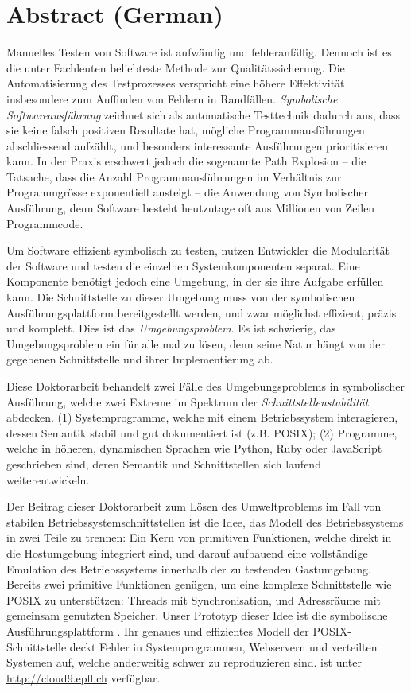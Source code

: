\chapter*{Abstract (German)}

Manuelles Testen von Software ist aufwändig und fehleranfällig. Dennoch ist es die unter Fachleuten beliebteste Methode zur Qualitätssicherung. Die Automatisierung des Testprozesses verspricht eine höhere Effektivität insbesondere zum Auffinden von Fehlern in Randfällen. \emph{Symbolische Softwareausführung} zeichnet sich als automatische Testtechnik dadurch aus, dass sie keine falsch positiven Resultate hat, mögliche Programmausführungen abschliessend aufzählt, und besonders interessante Ausführungen prioritisieren kann. In der Praxis erschwert jedoch die sogenannte Path Explosion – die Tatsache, dass die Anzahl Programmausführungen im Verhältnis zur Programmgrösse exponentiell ansteigt – die Anwendung von Symbolischer Ausführung, denn Software besteht heutzutage oft aus Millionen von Zeilen Programmcode.

Um Software effizient symbolisch zu testen, nutzen Entwickler die Modularität der Software  und testen die einzelnen Systemkomponenten separat. Eine Komponente benötigt jedoch eine Umgebung, in der sie ihre Aufgabe erfüllen kann. Die Schnittstelle zu dieser Umgebung muss von der symbolischen Ausführungsplattform bereitgestellt werden, und zwar möglichst effizient, präzis und komplett. Dies ist das \emph{Umgebungsproblem}. Es ist schwierig, das Umgebungsproblem ein für alle mal zu lösen, denn seine Natur hängt von der gegebenen Schnittstelle und ihrer Implementierung ab.

Diese Doktorarbeit behandelt zwei Fälle des Umgebungsproblems in symbolischer Aus\-füh\-rung, welche zwei Extreme im Spektrum der \emph{Schnittstellenstabilität} abdecken. (1) Systemprogramme, welche mit einem Betriebssystem interagieren, dessen Semantik stabil und gut dokumentiert ist (z.B. POSIX); (2) Programme, welche in höheren, dynamischen Sprachen wie Python, Ruby oder JavaScript geschrieben sind, deren Semantik und Schnittstellen sich laufend weiterentwickeln.

Der Beitrag dieser Doktorarbeit zum Lösen des Umweltproblems im Fall von stabilen Betriebssystemschnittstellen ist die Idee, das Modell des Betriebssystems in zwei Teile zu trennen: Ein Kern von primitiven Funktionen, welche direkt in die Hostumgebung integriert sind, und darauf aufbauend eine vollständige Emulation des Betriebssystems innerhalb der zu testenden Gastumgebung. Bereits zwei primitive Funktionen genügen, um eine komplexe Schnittstelle wie POSIX zu unterstützen: Threads mit Synchronisation, und Adressräume mit gemeinsam genutzten Speicher. Unser Prototyp dieser Idee ist die symbolische Ausführungsplattform \emph{\cnine}. Ihr genaues und effizientes Modell der POSIX-Schnittstelle deckt Fehler in Systemprogrammen, Webservern und verteilten Systemen auf, welche anderweitig schwer zu reproduzieren sind. \cnine ist unter {\url{http://cloud9.epfl.ch}} verfügbar.

